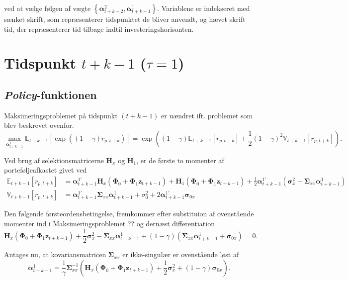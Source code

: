 \documentclass[
  a4paper,
  oneside]{memoir}
\begin{document}
ved at vælge følgen af vægte \(\left\{\bm{\alpha}_{t+k-2}^2, \bm{\alpha}_{t+k-1}^1\right\}\). Variablene er indekseret med sænket skrift, som repræsenterer tidspunktet de bliver anvendt, og hævet skrift tid, der repræsenterer tid tilbage indtil investeringshorisonten.

\hypertarget{tidspunkt-tk-1-tau1}{%
\section{\texorpdfstring{Tidspunkt \(t+k-1\) (\(\tau=1\))}{Tidspunkt t+k-1 (\textbackslash tau=1)}}\label{tidspunkt-tk-1-tau1}}

\hypertarget{policy-funktionen}{%
\subsection{\texorpdfstring{\emph{Policy}-funktionen}{Policy-funktionen}}\label{policy-funktionen}}

Maksimeringsproblemet på tidspunkt \((t+k-1)\) er uændret ift. problemet som blev beskrevet ovenfor.
\[\max_{\bm{\alpha}_{t+k-1}^1} \mathbb{E}_{t+k-1}[\exp((1-\gamma)r_{p,t+k})] = \exp\left((1-\gamma) \mathbb{E}_{t+k-1}[r_{p,t+k}]+\frac{1}{2}(1-\gamma)^2 \mathbb{V}_{t+k-1}[r_{p,t+k}]\right).\]

Ved brug af selektionsmatricerne \(\bm{H}_x\) og \(\bm{H}_1\), er de første to momenter af porteføljeafkastet givet ved
\begin{align*}
\mathbb{E}_{t+k-1}[r_{p,t+k}]&= \bm{\alpha}_{t+k-1}^{1\prime} \bm{H}_x (\bm{\Phi}_0 +\bm{\Phi}_1\bm{z}_{t+k-1}) + \bm{H}_1(\bm{\Phi}_0 +\bm{\Phi}_1\bm{z}_{t+k-1})+\frac{1}{2} \bm{\alpha}_{t+k-1}^{1\prime} (\bm{\sigma}_x^2-\bm{\Sigma}_{xx}\bm{\alpha}_{t+k-1}^{1})\\
\mathbb{V}_{t+k-1}[r_{p,t+k}]&=\bm{\alpha}_{t+k-1}^{1\prime}\bm{\Sigma}_{xx}\bm{\alpha}_{t+k-1}^{1}+ \sigma_0^2 + 2\bm{\alpha}_{t+k-1}^{1\prime}\bm{\sigma}_{0x}
\end{align*}

Den følgende førsteordensbetingelse, fremkommer efter substituion af ovenstående momenter ind i Maksimeringsproblemet ?? og dernæst differentiation
\[\bm{H}_x(\bm{\Phi}_0 +\bm{\Phi}_1\bm{z}_{t+k-1})+\frac{1}{2}\bm{\sigma}_x^2 - \bm{\Sigma}_{xx} \bm{\alpha}_{t+k-1}^{1}+(1-\gamma) (\bm{\Sigma}_{xx}\bm{\alpha}_{t+k-1}^{1}+\bm{\sigma}_{0x})=0.\]

Antages nu, at kovariansmatricen \(\bm{\Sigma}_{xx}\) er ikke-singulær er ovenstående løst af
\[\bm{\alpha}_{t+k-1}^{1}=\frac{1}{\gamma}\bm{\Sigma}_{xx}^{-1}\left(\bm{H}_x(\bm{\Phi}_0 +\bm{\Phi}_1\bm{z}_{t+k-1})+\frac{1}{2}\bm{\sigma}_x^2+(1-\gamma) \bm{\sigma}_{0x}\right).\]
\end{document}
